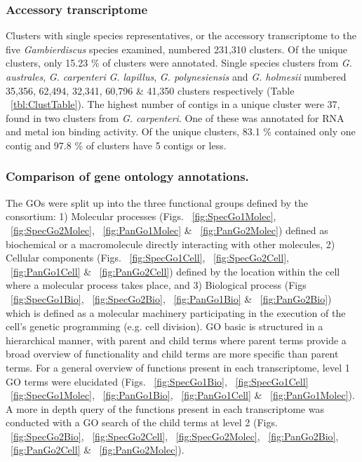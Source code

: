 \documentclass[12pt]{article}
\begin{document}
\subsubsection{Accessory transcriptome}
Clusters with single species representatives, or the accessory transcriptome to the five \textit{Gambierdiscus} species examined, numbered 231,310 clusters. 
Of the unique clusters, only 15.23 \% of clusters were annotated. 
Single species clusters from \emph{G. australes}, \textit{G. carpenteri} \textit{G. lapillus}, \textit{G. polynesiensis} and \textit{G. holmesii} numbered 35,356, 62,494, 32,341, 60,796 \& 41,350 clusters respectively (Table ~\ref{tbl:ClustTable}). 
The highest number of contigs in a unique cluster were 37, found in two clusters from \textit{G. carpenteri}. 
One of these was annotated for RNA and metal ion binding activity. 
Of the unique clusters, 83.1 \% contained only one contig and 97.8 \% of clusters have 5 contigs or less. 

\subsubsection{Comparison of gene ontology annotations.}
\FloatBarrier

The GOs were split up into the three functional groups defined by the consortium: 1) Molecular processes (Figs. ~\ref{fig:SpecGo1Molec}, ~\ref{fig:SpecGo2Molec}, ~\ref{fig:PanGo1Molec} \& ~\ref{fig:PanGo2Molec}) defined as biochemical or a macromolecule directly interacting with other molecules, 2) Cellular components (Figs. ~\ref{fig:SpecGo1Cell}, ~\ref{fig:SpecGo2Cell}, ~\ref{fig:PanGo1Cell} \& ~\ref{fig:PanGo2Cell}) defined by the location within the cell where a molecular process takes place, and 3) Biological process (Figs ~\ref{fig:SpecGo1Bio}, ~\ref{fig:SpecGo2Bio}, ~\ref{fig:PanGo1Bio} \& ~\ref{fig:PanGo2Bio}) which is defined as a molecular machinery participating in the execution of the cell's genetic programming (e.g. cell division).
GO basic is structured in a hierarchical manner, with parent and child terms where parent terms provide a broad overview of functionality and child terms are more specific than parent terms. 
For a general overview of functions present in each transcriptome, level 1 GO terms were elucidated (Figs. ~\ref{fig:SpecGo1Bio}, ~\ref{fig:SpecGo1Cell} ~\ref{fig:SpecGo1Molec}, ~\ref{fig:PanGo1Bio}, ~\ref{fig:PanGo1Cell} \& ~\ref{fig:PanGo1Molec}). 
A more in depth query of the functions present in each transcriptome was conducted with a GO search of the child terms at level 2 (Figs. ~\ref{fig:SpecGo2Bio}, ~\ref{fig:SpecGo2Cell}, ~\ref{fig:SpecGo2Molec}, ~\ref{fig:PanGo2Bio}, ~\ref{fig:PanGo2Cell} \& ~\ref{fig:PanGo2Molec}). 
\end{document}
